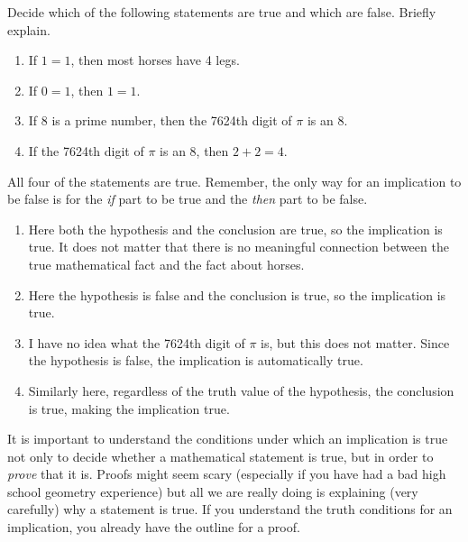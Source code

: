 \documentclass[11pt,]{book}
\theoremstyle{ptxplainnotitle}
\theoremstyle{ptxplaintitle}
\theoremstyle{ptxdefinitionnotitle}
\theoremstyle{ptxdefinitiontitle}
\theoremstyle{ptxdefinitionnotitle}
\theoremstyle{ptxdefinitiontitle}
\theoremstyle{ptxdefinitionnotitle}
\theoremstyle{ptxdefinitiontitle}
\theoremstyle{ptxdefinitiontitlenonumber}
\theoremstyle{ptxdefinitiontitlenonumber}
\numberwithin{equation}{chapter}
\begin{document}
\begin{example}\label{example-49}
\hypertarget{p-1751}{}%
Decide which of the following statements are true and which are false. Briefly explain. \leavevmode%
\begin{enumerate}
\item\hypertarget{li-745}{}\hypertarget{p-1752}{}%
If \(1=1\), then most horses have 4 legs.%
\item\hypertarget{li-746}{}\hypertarget{p-1753}{}%
If \(0=1\), then \(1=1\).%
\item\hypertarget{li-747}{}\hypertarget{p-1754}{}%
If 8 is a prime number, then the 7624th digit of \(\pi\) is an 8.%
\item\hypertarget{li-748}{}\hypertarget{p-1755}{}%
If the 7624th digit of \(\pi\) is an 8, then \(2+2 = 4\).%
\end{enumerate}
%
\par\smallskip%
\noindent\textbf{}\hypertarget{solution-216}{}\hypertarget{p-1756}{}%
All four of the statements are true. Remember, the only way for an implication to be false is for the \emph{if} part to be true and the \emph{then} part to be false. \leavevmode%
\begin{enumerate}
\item\hypertarget{li-749}{}\hypertarget{p-1757}{}%
Here both the hypothesis and the conclusion are true, so the implication is true. It does not matter that there is no meaningful connection between the true mathematical fact and the fact about horses.%
\item\hypertarget{li-750}{}\hypertarget{p-1758}{}%
Here the hypothesis is false and the conclusion is true, so the implication is true.%
\item\hypertarget{li-751}{}\hypertarget{p-1759}{}%
I have no idea what the 7624th digit of \(\pi\) is, but this does not matter. Since the hypothesis is false, the implication is automatically true.%
\item\hypertarget{li-752}{}\hypertarget{p-1760}{}%
Similarly here, regardless of the truth value of the hypothesis, the conclusion is true, making the implication true.%
\end{enumerate}
%
\end{example}
\hypertarget{p-1761}{}%
It is important to understand the conditions under which an implication is true not only to decide whether a mathematical statement is true, but in order to \emph{prove} that it is. Proofs might seem scary (especially if you have had a bad high school geometry experience) but all we are really doing is explaining (very carefully) why a statement is true. If you understand the truth conditions for an implication, you already have the outline for a proof.%
\end{document}
